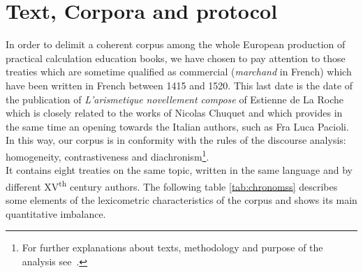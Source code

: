 \documentclass{elsarticle}
\begin{document}
\section{Text, Corpora and protocol}\label{corpus}

In order to delimit a coherent corpus among the whole European production of practical calculation education books, we have chosen to pay attention to those treaties which are sometime qualified as commercial (\textit{marchand} in French) which have been written in French between 1415 and 1520. This last date is the date of the publication of \textit{L'arismetique novellement compose} of Estienne de La Roche which is closely related to the works of Nicolas Chuquet and which provides in the same time an opening towards the Italian authors, such as Fra Luca Pacioli. In this way, our corpus is in conformity with the rules of the discourse analysis: homogeneity, contrastiveness and diachronism\footnote{For further explanations about texts, methodology and purpose of the analysis see~\cite{lamasse2012}.}. \\

It contains eight treaties on the same topic, written in the same language and by different XV\textsuperscript{th} century authors. The following table \ref{tab:chronomss} describes some elements of the lexicometric characteristics of the corpus and shows its main quantitative imbalance.
\end{document}
